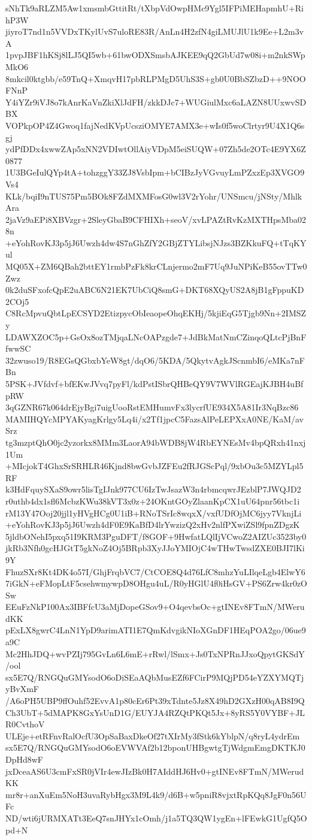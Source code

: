 sNhTk9aRLZM5Aw1xmsmbGttitRt/tXbpVdOwpHMc9Ygl5IFPiMEHapmhU+RihP3W
jiyroT7nd1n5VVDxTKylUvS7uloRE83R/AnLn4H2zfN4giLMUJlU1k9Ee+L2m3vA
1pvpJBF1hKSj8lLJ5QI5wb+61bwODXSmsbAJKEE9qQ2GbUd7w08i+m2nkSWpMkO6
8mkcil0ktgbb/e59TnQ+XmqvH17pbRLPMgD5UhS3S+gb0U0BbSZbzD++9NOOFNnP
Y4iYZr9iVJ8o7kAnrKaVnZkiXlJdFH/zkkDJc7+WUGiulMxc6aLAZN8UUxwvSDBX
VOPkpOP4Z4Gwoq1fajNedKVpUcsziOMYE7AMX3e+wIs0f5woClrtyr9U4X1Q6sgj
ydPfDDx4xwwZAp5xNN2VDIwtOllAiyVDpM5eiSUQW+07Zh5de2OTc4E9YX6Z0877
1U3BGeIulQYp4tA+tohzggY33ZJ8VsbIpm+bCIBzJyVGvuyLmPZxzEp3XVGO9Vs4
KLk/bqiI9nTUS75Pm5BOk8FZdMXMFosG0wl3V2rYohr/UNSmcu/jNSty/MhlkAra
2jaVz9aEPi8XBVzgr+2SleyGbaB9CFHIXh+seoV/xvLPAZtRvKzMXTHpsMba028n
+eYohRovKJ3p5jJ6Uwzh4dw4S7nGhZfY2GBjZTYLibsjNJzs3BZKkuFQ+tTqKYul
MQ05X+ZM6QBah2bttEY1rmbPzFk8krCLnjermo2mF7Uq9JuNPiKeB55ovTTw0Zwz
0k2duSFxofcQpE2uABC6N21EK7UbCiQ8smG+DKT68XQyUS2A8jB1gFppuKD2COj5
C8RcMpvuQbtLpECSYD2EtizpycObIeaopeOhqEKHj/5kjiEqG5Tjgb9Nn+2IMSZy
LDAWXZOC5p+GsOx8ozTMjqaLNcOAPzgde7+JdBkMatNmCZinqoQLtcPjBnFfwwSC
32zwuso19/R8EGsQGbxbYeW8gt/dqO6/5KDA/5QkytvAgkJScnmbI6/eMKa7nFBn
5PSK+JVfdvf+bfEKwJVvq7pyFl/kdPstISbrQHBeQY9V7WVlRGEajKJBH4uBfpRW
3qGZNR67k064drEjyBgi7uigUooRstEMHumvFx3lycrfUE934X5A81Ir3NqBzc86
MAMIHQYcMPYAKyagKrlgy5Lq4i/x2Tf1jpcC5FazsAlPeLEPXxA0NE/KaM/avSrz
tg3mzptQhO0jc2yzorkx8MMm3LaorA94bWDB8jW4RbEYNEsMv4bpQRxh41nxj1Um
+MIcjokT4GhxSrSRHLR46Kjnd8bwGvbJZFEu2fRJGScPql/9xbOu3c5MZYLpl5RF
k3HdFquySXaS9owr5lisTgIJnk977CU6IzTwJsazW3n4rbmcqwrJEzblP7JWQJD2
r0uthb4dx1sfl6McbzKWu38kVT3x0z+24OKntGOyZlaanKpCX1uU64pnr56tbc1i
rM13Y47Ooj20jjl1yHVgHCg0U1iB+RNoTSrIc8wqxX/vxfUDfOjMC6jyy7VknjLi
+eYohRovKJ3p5jJ6Uwzh4dF0E9KaBfD4lrYwzizQ2xHv2nlfPXwiZSl9fpnZDgzK
5jldbONehI5pxq51I9KRM3PguDFT/f8GOF+9HwfatLQlIjVCwoZ2AIZUc3523by0
jkRb3Nfh0gcHJGtT5gkNoZ4Oj5BRpb3XyJJoYMIOjC4wTHwTwsdZXE0BJI7lKi9Y
FhuzSXr8Kt4DK4o57I/GhjFrqbVC7/CtCOE8Q4d76LfC8mhzYuLIlqeLgb4ElwY6
7iGkN+eFMopLtF5csehwmywpD8OHgu4uL/R0yHGlU4f0iHsGV+PS6Zrw4kr0zOSw
EEuFzNkP100Ax3IBFfcU3aMjDopeGSov9+O4qevbsOc+gtINEv8FTmN/MWerudKK
pExLX8gwrC4LnN1YpD9arimATI1E7QmKdvgikNIoXGnDF1HEqPOA2go/06ue9a9C
Mc2HhJDQ+wvPZIj795GvLn6L6mE+rRwl/lSmx+Js0TxNPRnJJxoQpytGKSdY/ool
sx5E7Q/RNGQuGMYsodO6oDiSEaAQbMusEZf6FCirP9MQjPD54eYZXYMQTjyBvXmF
/A6oPH5UBP9ffOuhf52EvvA1p80cEr6Pt39xTdnte5Jz8X49hD2GXzH00qAB8I9Q
Ch3UbT+5dMAPK8GxYsUnD1G/EUYJA4RZQtPKQt5Jx+8yRS5Y0VYBF+JLR0CvthoV
ULEje+etRFnvRalOcfU3OpSaBaxDkeOf27tXIrMy3fStk6kYblpN/q8ryL4ydrEm
sx5E7Q/RNGQuGMYsodO6oEVWVAf2b12bponUHBgwtgTjWdgmEmgDKTKJ0DpHd8wF
jxDceaAS6U3cmFxSR0jVIr4ewJIzBk0H7AIddHJ6Hv0+gtINEv8FTmN/MWerudKK
mr8r+anXuEm5NoH3uvaRybHgx3M9L4k9/d6B+w5pniR8vjxtRpKQq8JgF0n56UFc
ND/wti6jURMXATt3EeQ7snJHYx1cOmh/j1a5TQ3QW1ygEn+lFEwkG1UgfQ5Opd+N
